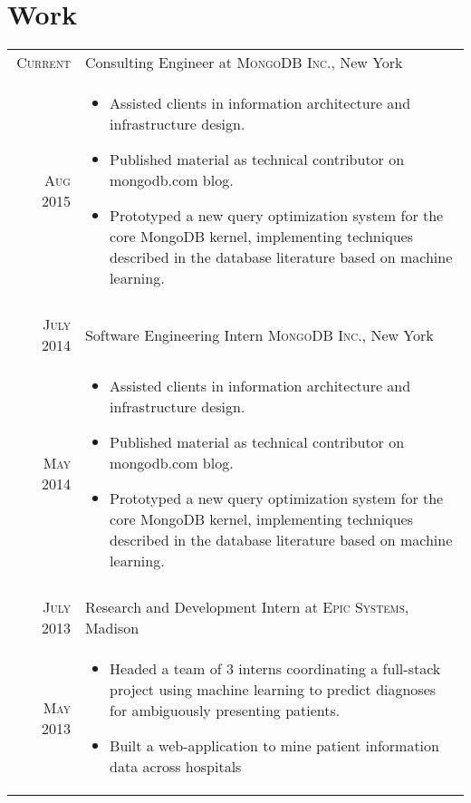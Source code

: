 \documentclass[a4paper,10pt]{article}
\begin{document}
\section{Work}
\begin{longtable}{r|p{11cm}}
 \nopagebreak \textsc{Current} & Consulting Engineer at \textsc{MongoDB Inc.}, New York \\
 \nopagebreak \textsc{Aug 2015} &\footnotesize{
	\begin{itemize}
		\item[]{
			Assisted clients in information architecture and infrastructure design.
		}
		\item[]{
			Published material as technical contributor on mongodb.com blog.
		}
		\item[]{
			Prototyped a new query optimization system for the core MongoDB kernel,
			implementing techniques described in the database literature based on 
			machine learning.
		}
	\end{itemize}
   }\\
 \multicolumn{2}{c}{} \\
 \nopagebreak \textsc{July 2014} & Software Engineering Intern \textsc{MongoDB Inc.}, New York\\
 \nopagebreak \textsc{May 2014} &\footnotesize{
	\begin{itemize}
		\item[]{
			Assisted clients in information architecture and infrastructure design.
		}
		\item[]{
			Published material as technical contributor on mongodb.com blog.
		}
		\item[]{
			Prototyped a new query optimization system for the core MongoDB kernel,
			implementing techniques described in the database literature based on 
			machine learning.
		}
	\end{itemize}
   }\\
 \multicolumn{2}{c}{} \\
 \nopagebreak \textsc{July 2013} & Research and Development Intern at \textsc{Epic Systems}, Madison\\
 \nopagebreak \textsc{May 2013} &\footnotesize{
	\begin{itemize}
		\item[]{
			Headed a team of 3 interns coordinating a full-stack project using
			machine learning to predict diagnoses for ambiguously presenting patients.
		}
		\item[]{
			Built a web-application to mine patient information data across hospitals
}
\end{itemize}}
\end{longtable}
\end{document}
